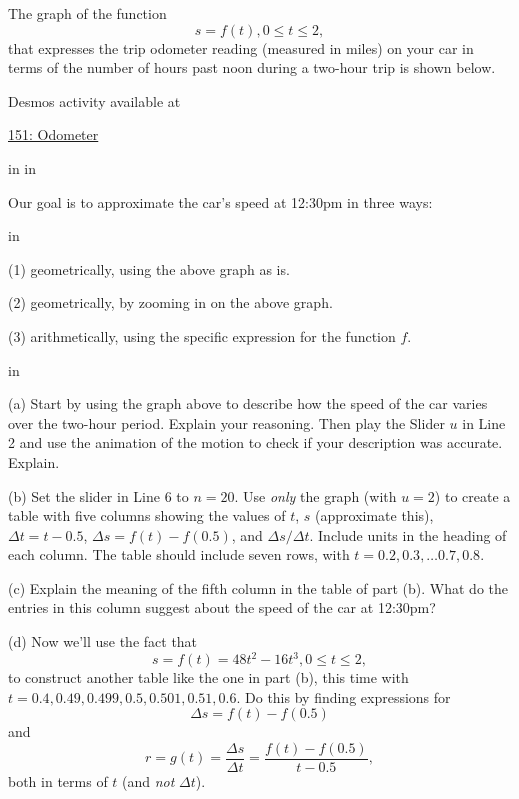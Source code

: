 \documentclass{ximera}
\newcommand{\pskip}{\vskip 0.1 in}
\begin{document}
\begin{example} \label{Ex:lkdftr45}
The graph of the function
\[
    s = f(t) , 0\leq t \leq 2 ,
\]
that expresses the trip odometer reading (measured in miles) on your car in terms of the number of hours past noon during a two-hour trip is shown below.

 
\begin{onlineOnly}
    \begin{center}
\end{center}
\end{onlineOnly}

Desmos activity available at

\href{https://www.desmos.com/calculator/tumgpu4n0w}{151: Odometer}

\pskip \pskip

Our goal is to approximate the car's speed at 12:30pm in three ways:

\pskip

(1) geometrically, using the above graph as is.

(2) geometrically, by zooming in on the above graph.

(3) arithmetically, using the specific expression for the function $f$.


\pskip

(a) Start by using the graph above to describe how the speed of the car varies over the two-hour period. Explain your reasoning. Then play the Slider $u$ in Line 2 and use the animation of the motion to check if your description was accurate. Explain.

(b) Set the slider in Line 6 to $n=20$. Use \emph{only} the graph (with $u=2$) to create a table with five columns showing the values of $t$, $s$ (approximate this), $\Delta t = t-0.5$, $\Delta s=f(t)-f(0.5)$, and $\Delta s / \Delta t$. Include units in the heading of each column. The table should include seven rows, with $t=0.2, 0.3, \ldots 0.7, 0.8$. 

(c) Explain the meaning of the fifth column in the table of part (b). What do the entries in this column suggest about the speed of the car at 12:30pm?

(d) Now we'll use the fact that
\[
   s = f(t) = 48t^2 - 16t^3, 0 \leq t \leq 2 ,
\]
to construct another table like the one in part (b), this time with $t=0.4, 0.49, 0.499, 0.5, 0.501, 0.51, 0.6$. Do this by finding expressions for 
\[
    \Delta s = f(t) - f(0.5)
\]
and
\[
   r = g(t) = \frac{\Delta s}{\Delta t} = \frac{f(t) - f(0.5)}{t-0.5} ,
\]
both in terms of $t$ (and \emph{not} $\Delta t$).



\end{example}
\end{document}
